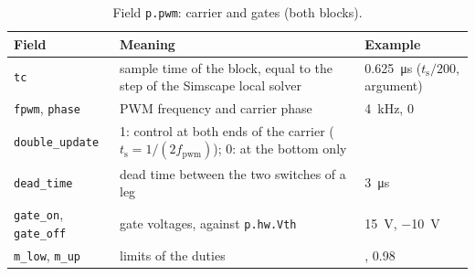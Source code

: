 \documentclass[11pt,a4paper]{scrartcl}
\newcommand{\ped}[1]{_{\mathrm{#1}}}
\newcommand{\code}[1]{\texttt{#1}}
\begin{document}
\begin{onehalfspace}
\begin{table}[H]
	\centering
	\captionsetup{width=0.9\textwidth, font=small}
	\caption[Field \code{p.pwm}.]{Field \code{p.pwm}: carrier and gates (both blocks).}
	\label{tab:pwm}
	\footnotesize
	\begin{tabularx}{0.97\textwidth}{@{} >{\raggedright\arraybackslash}p{} X >{\raggedright\arraybackslash}p{} @{}}
		\toprule
		\textbf{Field} & \textbf{Meaning} & \textbf{Example} \\
		\midrule
		\code{tc} & sample time of the block, equal to the step of the Simscape local solver & \SI{0.625}{\micro\second} ($t\ped{s}/200$, argument) \\
		\code{fpwm}, \code{phase} & PWM frequency and carrier phase & \SI{4}{\kilo\hertz}, 0 \\
		\code{double\_update} & 1: control at both ends of the carrier ($t\ped{s} = 1/(2 f\ped{pwm})$); 0: at the bottom only & 1 \\
		\code{dead\_time} & dead time between the two switches of a leg & \SI{3}{\micro\second} \\
		\code{gate\_on}, \code{gate\_off} & gate voltages, against \code{p.hw.Vth} & \SI{15}{\volt}, \SI{-10}{\volt} \\
		\code{m\_low}, \code{m\_up} & limits of the duties & 0.02, 0.98 \\
		\bottomrule
	\end{tabularx}
\end{table}


\end{onehalfspace}
\end{document}
